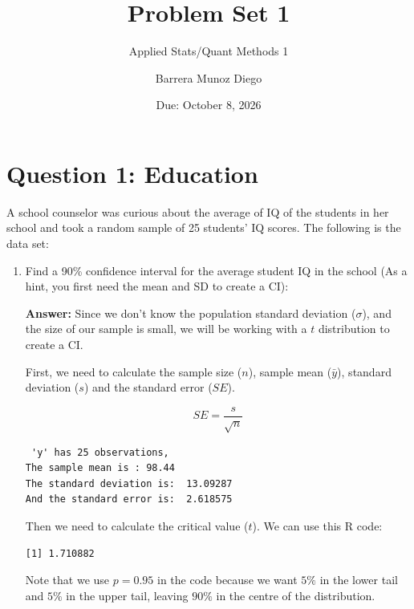 \documentclass[12pt,letterpaper]{article}
\title{Problem Set 1}
\author{Applied Stats/Quant Methods 1}
\date{Due: October 8, 2026}
\author{Barrera Munoz Diego}
\begin{document}
	\maketitle
	\tableofcontents
	\newpage

	\section{Question 1: Education}

A school counselor was curious about the average of IQ of the students in her school and took a random sample of 25 students' IQ scores. The following is the data set:\\

  

\begin{enumerate}
	
	\item Find a 90\% confidence interval for the average student IQ in the school (As a hint, you first need the mean and SD to create a CI):\\
	
\vspace{.5cm}
	
\textbf{Answer:} Since we don't know the population standard deviation ($\sigma$), and the size of our sample is small, we will be working with a $t$ distribution to create a CI. 

First, we need to calculate the sample size ($n$), sample mean ($\bar{y}$), standard deviation ($s$) and the standard error ($SE$). 

$$SE = \frac{s}{\sqrt{n}}$$



\begin{verbatim}
 'y' has 25 observations, 
The sample mean is : 98.44  
The standard deviation is:  13.09287  
And the standard error is:  2.618575
\end{verbatim}

Then we need to calculate the critical value ($t$). We can use this R code:



\begin{verbatim}
[1] 1.710882
\end{verbatim}

Note that we use $p = 0.95$ in the code because we want $5\%$ in the lower tail and $5\%$ in the upper tail, leaving $90\%$ in the centre of the distribution.


\end{enumerate}
\end{document}
